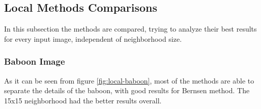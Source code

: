 \documentclass[]{IEEEtran}
\begin{document}
\subsection{Local Methods Comparisons}

In this subsection the methods are compared, trying to analyze their best results for every input image, independent of neighborhood size.

\subsubsection{Baboon Image}

As it can be seen from figure \ref{fig:local-baboon}, most of the methods are able to separate the details of the baboon, with good results for Bernsen method. The 15x15 neighborhood had the better results overall.
\end{document}
